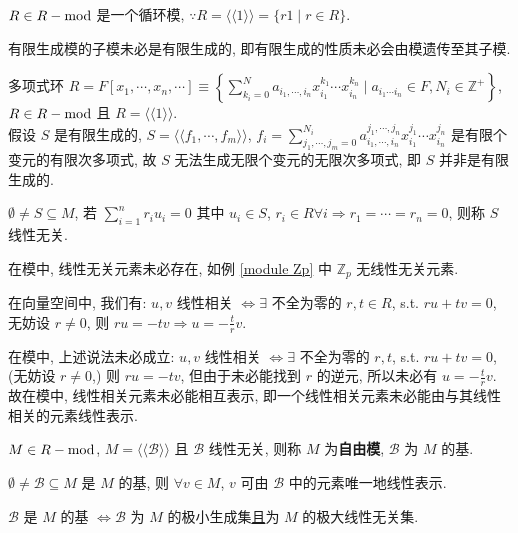 \documentclass{note}
\begin{document}
\begin{eg}
    $R\in R-\operatorname{mod}$ 是一个循环模, $\because R=\langle\langle 1\rangle\rangle=\{r1\mid r\in R\}$.
\end{eg}

有限生成模的子模未必是有限生成的, 即有限生成的性质未必会由模遗传至其子模.
\begin{eg}
    多项式环 $R=F[x_1,\cdots,x_n,\cdots]\equiv\left\{\sum_{k_i=0}^Na_{i_1,\cdots,i_n}x_{i_1}^{k_1}\cdots x_{i_n}^{k_n}\mid a_{i_1\cdots i_n}\in F,N_i\in\mathbb{Z}^+\right\}$, $R\in R-\operatorname{mod}$ 且 $R=\langle\langle 1\rangle\rangle$.\\
    假设 $S$ 是有限生成的, $S=\langle\langle f_1,\cdots,f_m\rangle\rangle$, $f_i=\sum_{j_1,\cdots,j_m=0}^{N_i}a_{i_1,\cdots,i_n}^{j_1,\cdots,j_n}x_{i_1}^{j_1}\cdots x_{i_n}^{j_n}$ 是有限个变元的有限次多项式, 故 $S$ 无法生成无限个变元的无限次多项式, 即 $S$ 并非是有限生成的.
\end{eg}

\begin{df}[线性无关]
    $\emptyset\neq S\subseteq M$, 若 $\sum_{i=1}^nr_iu_i=0$ 其中 $u_i\in S$, $r_i\in R\forall i\Longrightarrow r_1=\cdots=r_n=0$, 则称 $S$ 线性无关.
\end{df}

在模中, 线性无关元素未必存在, 如例 \ref{module Zp} 中 $\mathbb{Z}_p$ 无线性无关元素.

在向量空间中, 我们有: $u,v$ 线性相关 $\Longleftrightarrow\exists$ 不全为零的 $r,t\in R$, s.t. $ru+tv=0$, 无妨设 $r\neq 0$, 则 $ru=-tv\Longrightarrow u=-\frac{t}{r}v$.

在模中, 上述说法未必成立: $u,v$ 线性相关 $\Longleftrightarrow\exists$ 不全为零的 $r,t$, s.t. $ru+tv=0$, (无妨设 $r\neq 0$,) 则 $ru=-tv$, 但由于未必能找到 $r$ 的逆元, 所以未必有 $u=-\frac{t}{r}v$. 故在模中, 线性相关元素未必能相互表示, 即一个线性相关元素未必能由与其线性相关的元素线性表示.

\begin{df}[自由模]
    $M\in R-\operatorname{mod}$, $M=\langle\langle\mathcal{B}\rangle\rangle$ 且 $\mathcal{B}$ 线性无关, 则称 $M$ 为\textbf{自由模}, $\mathcal{B}$ 为 $M$ 的基.
\end{df}

\begin{thm}[(课本定理 4.3)]
    $\emptyset\neq\mathcal{B}\subseteq M$ 是 $M$ 的基, 则 $\forall v\in M$, $v$ 可由 $\mathcal{B}$ 中的元素唯一地线性表示.
\end{thm}

\begin{thm}[(课本定理 4.4)]
     $\mathcal{B}$ 是 $M$ 的基 $\Longleftrightarrow\mathcal{B}$ 为 $M$ 的极小生成集\uline{且}为 $M$ 的极大线性无关集.
\end{thm}
\end{document}
